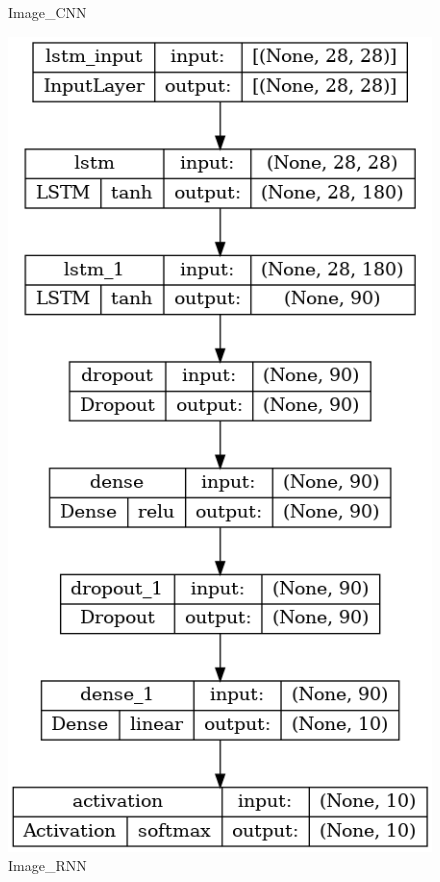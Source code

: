 \begin{figure}[!ht]
\begin{minipage}{0.5\textwidth}
        \caption{Image\_CNN}
    \end{minipage}\hfill
    \begin{minipage}{0.5\textwidth}
        \centering
        \includegraphics[width=\linewidth]{obrazky-figures/model-plots/Image_RNN.png} %
        \caption{Image\_RNN}
    \end{minipage}
\end{figure}
\newpage

